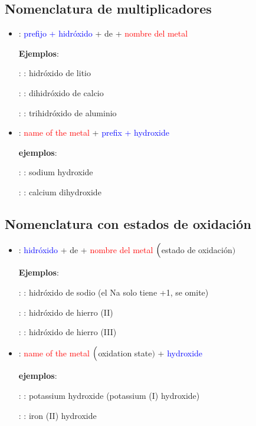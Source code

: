 \subsection{Nomenclatura de multiplicadores}

\begin{itemize}
    \item \noindent{}: \textcolor{blue}{prefijo + hidróxido} + de + \textcolor{red}{nombre del metal}

    \textbf{Ejemplos}:

    : : hidróxido de litio

    : : dihidróxido de calcio

    : : trihidróxido de aluminio


    \item \noindent{}: \textcolor{red}{name of the metal} + \textcolor{blue}{prefix + hydroxide}

    \textbf{ejemplos}:

    : : sodium hydroxide

    : : calcium dihydroxide
\end{itemize}

\subsection{Nomenclatura con estados de oxidación}

\begin{itemize}
    \item \noindent{}: \textcolor{blue}{hidróxido} + de + \textcolor{red}{nombre del metal} $\Bigl($\textcolor{green!50!black}{estado de oxidación}$\Bigr)$

    \textbf{Ejemplos}:

    : : hidróxido de sodio (el Na solo tiene +1, se omite)

    : : hidróxido de hierro (II)

    : : hidróxido de hierro (III)


    \item \noindent{}: \textcolor{red}{name of the metal} $\Bigl($\textcolor{green!50!black}{oxidation state}$\Bigr)$ + \textcolor{blue}{hydroxide}

    \textbf{ejemplos}:

    : : potassium hydroxide (potassium (I) hydroxide)

    : : iron (II) hydroxide
\end{itemize}


